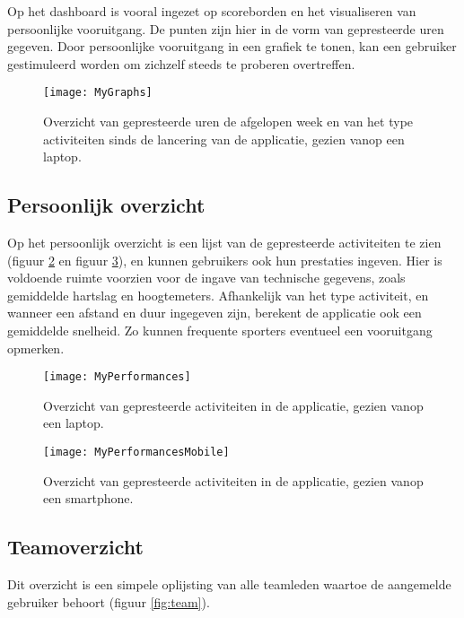 Op het dashboard is vooral ingezet op scoreborden en het visualiseren van persoonlijke vooruitgang. De punten zijn hier in de vorm van gepresteerde uren gegeven. Door persoonlijke vooruitgang in een grafiek te tonen, kan een gebruiker gestimuleerd worden om zichzelf steeds te proberen overtreffen.

\begin{figure}[h]
    \caption[Overzicht prestaties dashboard website]{Overzicht van gepresteerde uren de afgelopen week en van het type activiteiten sinds de lancering van de applicatie, gezien vanop een laptop.}
    \texttt{[image: MyGraphs]}
    \label{fig:graphs}
\end{figure}

\subsection{Persoonlijk overzicht}
Op het persoonlijk overzicht is een lijst van de gepresteerde activiteiten te zien (figuur \ref{fig:performances} en figuur \ref{fig:performancesMobile}), en kunnen gebruikers ook hun prestaties ingeven. Hier is voldoende ruimte voorzien voor de ingave van technische gegevens, zoals gemiddelde hartslag en hoogtemeters. Afhankelijk van het type activiteit, en wanneer een afstand en duur ingegeven zijn, berekent de applicatie ook een gemiddelde snelheid. Zo kunnen frequente sporters eventueel een vooruitgang opmerken.

\begin{figure}[h]
    \caption[Overzicht activiteiten website]{Overzicht van gepresteerde activiteiten in de applicatie, gezien vanop een laptop.}
    \texttt{[image: MyPerformances]}
    \label{fig:performances}
\end{figure}

\begin{figure}[h]
    \caption[Overzicht activiteiten website smartphone]{Overzicht van gepresteerde activiteiten in de applicatie, gezien vanop een smartphone.}
    \texttt{[image: MyPerformancesMobile]}
    \label{fig:performancesMobile}
\end{figure}

\subsection{Teamoverzicht}

Dit overzicht is een simpele oplijsting van alle teamleden waartoe de aangemelde gebruiker behoort (figuur \ref{fig:team}).

